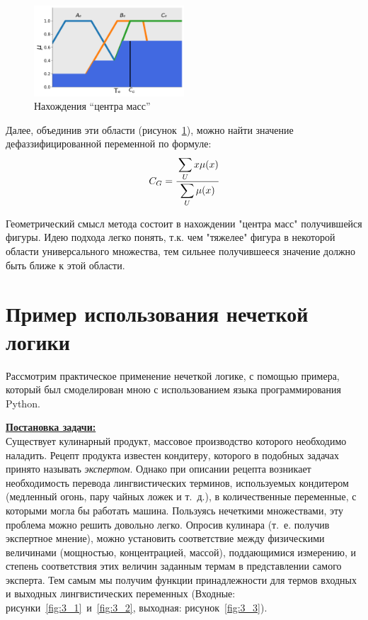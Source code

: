 \documentclass[a4paper,12pt]{article}
\begin{document}
	\begin{figure}[h]
		\centering
		\includegraphics[width=0.5\textwidth]{Figure_2_3}
		\caption{Нахождения ``центра масс''}
		\label{fig:2_3}
	\end{figure}
	
	Далее, объединив эти области (рисунок~\ref{fig:2_3}), можно найти значение дефаззифицированной переменной по формуле:
	\[C_G=\cfrac{\displaystyle\sum_{U} x\mu(x)}{\displaystyle\sum_{U} \mu(x)}\]
	
	Геометрический смысл метода состоит в нахождении "центра масс" получившейся фигуры. Идею подхода легко понять, т.к. чем "тяжелее" фигура в некоторой области универсального множества, тем сильнее получившееся значение должно быть ближе к этой области.


	\section{Пример использования нечеткой логики}
	
	Рассмотрим практическое применение нечеткой логике, с помощью примера, который был смоделирован мною с использованием языка программирования Python.
	
	\underline{\textbf{Постановка задачи:}}\\
	Существует кулинарный продукт, массовое производство которого необходимо наладить. Рецепт продукта известен кондитеру, которого в подобных задачах принято называть \textit{экспертом}. Однако при описании рецепта возникает необходимость перевода лингвистических терминов, используемых кондитером (медленный огонь, пару чайных ложек и т. д.), в количественные переменные, с которыми могла бы работать машина. Пользуясь нечеткими множествами, эту проблема можно решить довольно легко. Опросив кулинара (т. е. получив экспертное мнение), можно установить соответствие между физическими величинами (мощностью, концентрацией, массой), поддающимися измерению, и степень соответствия этих величин заданным термам в представлении самого эксперта. Тем самым мы получим функции принадлежности для термов входных и выходных лингвистических переменных (Входные: рисунки~\ref{fig:3_1}~и~\ref{fig:3_2}, выходная: рисунок~\ref{fig:3_3}).
	
\end{document}

